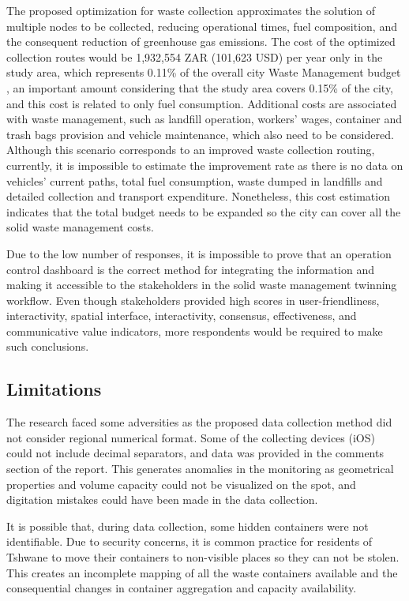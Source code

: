 \documentclass[authoryear,preprint,review,12pt]{elsarticle}
\begin{document}
    The proposed optimization for waste collection approximates the solution of multiple nodes to be collected, reducing operational times, fuel composition, and the consequent reduction of greenhouse gas emissions. The cost of the optimized collection routes would be 1,932,554 ZAR (101,623 USD) per year only in the study area, which represents 0.11\% of the overall city Waste Management budget \citep{tshwane20232024MediumtermRevenue2023}, an important amount considering that the study area covers 0.15\% of the city, and this cost is related to only fuel consumption. Additional costs are associated with waste management, such as landfill operation, workers’ wages, container and trash bags provision and vehicle maintenance, which also need to be considered. Although this scenario corresponds to an improved waste collection routing, currently, it is impossible to estimate the improvement rate as there is no data on vehicles' current paths, total fuel consumption, waste dumped in landfills and detailed collection and transport expenditure. Nonetheless, this cost estimation indicates that the total budget needs to be expanded so the city can cover all the solid waste management costs.

    Due to the low number of responses, it is impossible to prove that an operation control dashboard is the correct method for integrating the information and making it accessible to the stakeholders in the solid waste management twinning workflow. Even though stakeholders provided high scores in user-friendliness, interactivity, spatial interface, interactivity, consensus, effectiveness, and communicative value indicators, more respondents would be required to make such conclusions.

    \subsection{Limitations} \label{subsec:limitations}

    The research faced some adversities as the proposed data collection method did not consider regional numerical format. Some of the collecting devices (iOS) could not include decimal separators, and data was provided in the comments section of the report. This generates anomalies in the monitoring as geometrical properties and volume capacity could not be visualized on the spot, and digitation mistakes could have been made in the data collection.

    It is possible that, during data collection, some hidden containers were not identifiable. Due to security concerns, it is common practice for residents of Tshwane to move their containers to non-visible places so they can not be stolen. This creates an incomplete mapping of all the waste containers available and the consequential changes in container aggregation and capacity availability.
\end{document}
